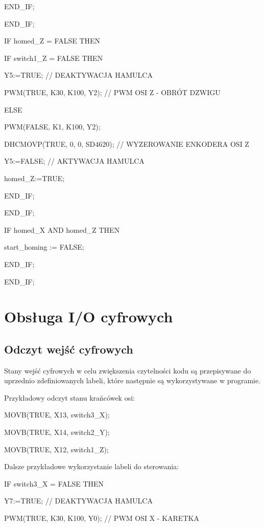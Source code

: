 \documentclass{mwrep}
\begin{document}
\quad \quad END\_IF;

\quad END\_IF;

\quad IF homed\_Z = FALSE THEN

\quad \quad IF switch1\_Z = FALSE THEN

\quad \quad \quad Y5:=TRUE; // DEAKTYWACJA HAMULCA

\quad \quad \quad PWM(TRUE, K30, K100, Y2); // PWM OSI Z - OBRÓT DZWIGU

\quad \quad \quad ELSE

\quad \quad \quad PWM(FALSE, K1, K100, Y2);

\quad \quad \quad DHCMOVP(TRUE, 0, 0, SD4620); // WYZEROWANIE ENKODERA OSI Z

\quad \quad \quad Y5:=FALSE; // AKTYWACJA HAMULCA

\quad \quad \quad homed\_Z:=TRUE;

\quad \quad END\_IF;

\quad END\_IF;
		
\quad IF homed\_X AND homed\_Z THEN

\quad \quad start\_homing := FALSE;

\quad END\_IF;

END\_IF;


\section{Obsługa I/O cyfrowych}
\label{PLC::IOCyfrowe}

\subsection{Odczyt wejść cyfrowych}
Stany wejść cyfrowych w celu zwiększenia czytelności kodu są przepisywane do uprzednio zdefiniowanych labeli, które następnie są wykorzystywane w programie.
	
Przykładowy odczyt stanu krańcówek osi:
	
MOVB(TRUE, X13, switch3\_X);

MOVB(TRUE, X14, switch2\_Y);

MOVB(TRUE, X12, switch1\_Z);

\vspace{1cm}

Dalsze przykładowe wykorzystanie labeli do sterowania:

IF switch3\_X = FALSE THEN

\quad Y7:=TRUE; // DEAKTYWACJA HAMULCA

\quad PWM(TRUE, K30, K100, Y0); // PWM OSI X - KARETKA
\end{document}
